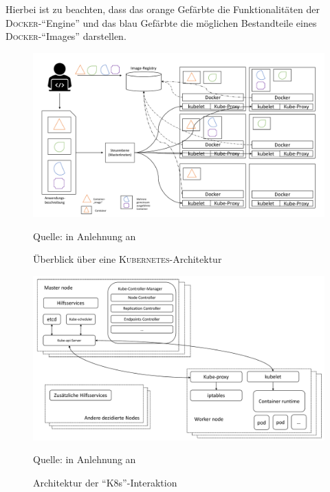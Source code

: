 Hierbei ist zu beachten, dass das orange Gefärbte die Funktionalitäten der \textsc{Docker}-\enquote{Engine} und das blau Gefärbte die möglichen Bestandteile eines \textsc{Docker}-\enquote{Images} darstellen.


\begin{figure}[H]
	\centering
	\includegraphics[scale=0.46]{img/k8sArch.pdf}
	\caption{Überblick über eine \textsc{Kubernetes}-Architektur}
	{\footnotesize Quelle: in Anlehnung an \cite[][S.\,23]{luksa_kubernetes_2018}}
	\label{abb:k8sArch}
\end{figure}

\begin{figure}[H]
	\centering
	\includegraphics[scale=0.46]{img/k8sArchInteraktion.pdf}
	\caption{Architektur der \enquote{\ac{K8s}}-Interaktion}
	{\footnotesize Quelle: in Anlehnung an \cite[][S.\,15]{caban_architecting_2019}}
	\label{abb:k8sArchInteraktion}
\end{figure}



